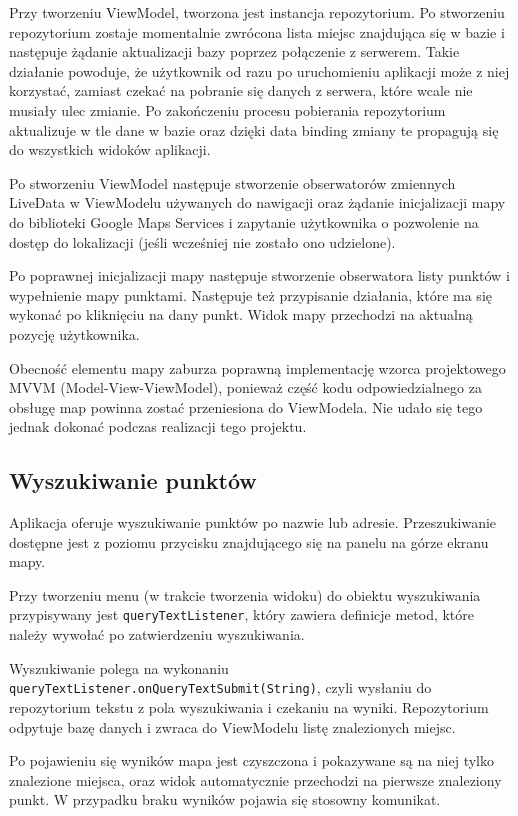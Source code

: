 \documentclass[polish,polish,a4paper,12pt]{article}
\begin{document}
	Przy tworzeniu ViewModel, tworzona jest instancja repozytorium. Po stworzeniu repozytorium zostaje momentalnie zwrócona lista miejsc znajdująca się w bazie i następuje żądanie aktualizacji bazy poprzez połączenie z serwerem. Takie działanie powoduje, że użytkownik od razu po uruchomieniu aplikacji może z niej korzystać, zamiast czekać na pobranie się danych z serwera, które wcale nie musiały ulec zmianie. Po zakończeniu procesu pobierania repozytorium aktualizuje w tle dane w bazie oraz dzięki data binding zmiany te propagują się do wszystkich widoków aplikacji.

	Po stworzeniu ViewModel następuje stworzenie obserwatorów zmiennych LiveData w ViewModelu używanych do nawigacji oraz żądanie inicjalizacji mapy do biblioteki Google Maps Services i zapytanie użytkownika o pozwolenie na dostęp do lokalizacji (jeśli wcześniej nie zostało ono udzielone).

	Po poprawnej inicjalizacji mapy następuje stworzenie obserwatora listy punktów i wypełnienie mapy punktami. Następuje też przypisanie działania, które ma się wykonać po kliknięciu na dany punkt. Widok mapy przechodzi na aktualną pozycję użytkownika.

	Obecność elementu mapy zaburza poprawną implementację wzorca projektowego MVVM (Model-View-ViewModel), ponieważ część kodu odpowiedzialnego za obsługę map powinna zostać przeniesiona do ViewModela. Nie udało się tego jednak dokonać podczas realizacji tego projektu.

	\subsection{Wyszukiwanie punktów}

	Aplikacja oferuje wyszukiwanie punktów po nazwie lub adresie. Przeszukiwanie dostępne jest z poziomu przycisku znajdującego się na panelu na górze ekranu mapy.

	Przy tworzeniu menu (w trakcie tworzenia widoku) do obiektu wyszukiwania przypisywany jest \texttt{queryTextListener}, który zawiera definicje metod, które należy wywołać po zatwierdzeniu wyszukiwania.

	Wyszukiwanie polega na wykonaniu \texttt{queryTextListener.onQueryTextSubmit(String)}, czyli wysłaniu do repozytorium tekstu z pola wyszukiwania i czekaniu na wyniki. Repozytorium odpytuje bazę danych i zwraca do ViewModelu listę znalezionych miejsc.

	Po pojawieniu się wyników mapa jest czyszczona i pokazywane są na niej tylko znalezione miejsca, oraz widok automatycznie przechodzi na pierwsze znaleziony punkt. W przypadku braku wyników pojawia się stosowny komunikat.
\end{document}
